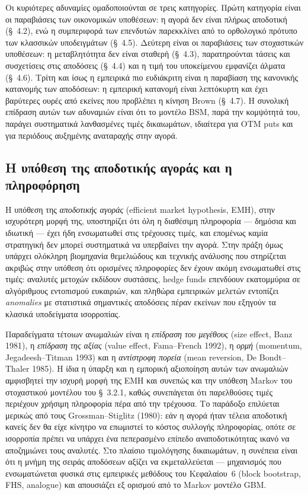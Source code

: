 \documentclass[12pt]{article}
\begin{document}
Οι κυριότερες αδυναμίες ομαδοποιούνται σε τρεις κατηγορίες. Πρώτη κατηγορία είναι οι παραβιάσεις των οικονομικών υποθέσεων: η αγορά δεν είναι πλήρως αποδοτική (\S~4.2), ενώ η συμπεριφορά των επενδυτών παρεκκλίνει από το ορθολογικό πρότυπο των κλασσικών υποδειγμάτων (\S~4.5). Δεύτερη είναι οι παραβιάσεις των στοχαστικών υποθέσεων: η μεταβλητότητα δεν είναι σταθερή (\S~4.3), παρατηρούνται τάσεις και συσχετίσεις στις αποδόσεις (\S~4.4) και η τιμή του υποκείμενου εμφανίζει άλματα (\S~4.6). Τρίτη και ίσως η εμπειρικά πιο ευδιάκριτη είναι η παραβίαση της κανονικής κατανομής των αποδόσεων: η εμπειρική κατανομή είναι λεπτόκυρτη και έχει βαρύτερες ουρές από εκείνες που προβλέπει η κίνηση Brown (\S~4.7). Η συνολική επίδραση αυτών των αδυναμιών είναι ότι το μοντέλο BSM, παρά την κομψότητά του, παράγει συστηματικά λανθασμένες τιμές δικαιωμάτων, ιδιαίτερα για OTM puts και για περιόδους αυξημένης αναταραχής στην αγορά.

\subsection{Η υπόθεση της αποδοτικής αγοράς και η πληροφόρηση}

Η υπόθεση της \emph{αποδοτικής αγοράς} (efficient market hypothesis, EMH), στην ισχυρότερη μορφή της, υποστηρίζει ότι όλη η διαθέσιμη πληροφορία — δημόσια και ιδιωτική — έχει ήδη ενσωματωθεί στις τρέχουσες τιμές, και επομένως καμία στρατηγική δεν μπορεί συστηματικά να υπερβαίνει την αγορά. Στην πράξη όμως υπάρχει ολόκληρη βιομηχανία θεμελιώδους και τεχνικής ανάλυσης που στηρίζεται ακριβώς στην υπόθεση ότι ορισμένες πληροφορίες δεν έχουν ακόμη ενσωματωθεί στις τιμές: αναλυτές μετοχών εκδίδουν συστάσεις, hedge funds επενδύουν εκατομμύρια σε αλγόριθμους εντοπισμού ευκαιριών, και πληθώρα εμπειρικών μελετών εντοπίζει \emph{anomalies} με στατιστικά σημαντικές αποδόσεις πέραν εκείνων που εξηγούν τα κλασικά υποδείγματα ισορροπίας.

Παραδείγματα τέτοιων ανωμαλιών είναι η \emph{επίδραση του μεγέθους} (size effect, Banz 1981), η \emph{επίδραση της αξίας} (value effect, Fama–French 1992), η \emph{ορμή} (momentum, Jegadeesh–Titman 1993) και η \emph{αντίστροφη πορεία} (mean reversion, De Bondt–Thaler 1985). Η ίδια η ύπαρξη και η εμπορική αξιοποίηση αυτών των ανωμαλιών αμφισβητεί την ισχυρή μορφή της EMH και συνεπώς και την υπόθεση Markov του στοχαστικού μοντέλου του \S~3.2.1, καθώς συνεπάγεται ότι παρελθούσες τιμές περιέχουν χρήσιμη πληροφορία πέρα από την τρέχουσα. Το παράδοξο επιλύεται μερικώς από τους Grossman–Stiglitz (1980): εάν η αγορά ήταν τέλεια αποδοτική κανείς δεν θα είχε κίνητρο να επωμιστεί το κόστος συλλογής πληροφορίας, οπότε σε ισορροπία πρέπει να υπάρχει ένα πεπερασμένο επίπεδο αναποδοτικότητας ικανό να αποζημιώνει τους αναλυτές. Στο πλαίσιο τιμολόγησης δικαιωμάτων, η συνέπεια είναι ότι η μνήμη της σειράς αποδόσεων αξίζει να εκμεταλλεύεται — μηχανισμός που ενσωματώνεται φυσικά στις εμπειρικές μεθόδους του Κεφαλαίου~6 (block bootstrap, FHS, analogue) και απουσιάζει εξ ορισμού από το Markov μοντέλο GBM.
\end{document}
